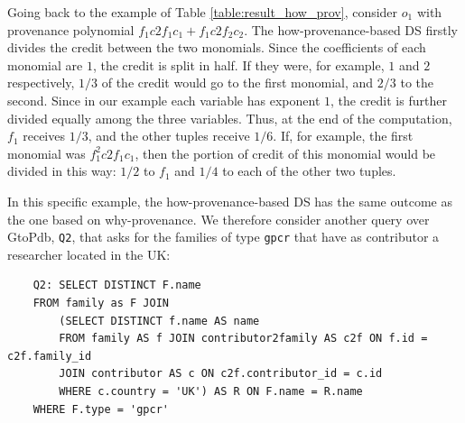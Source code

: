 %


Going back to the example of Table \ref{table:result_how_prov}, consider $o_1$ with provenance polynomial $f_1 c2f_1 c_1 + f_1 c2f_2 c_2$. The how-provenance-based DS firstly divides the credit between the two monomials. Since the coefficients of each monomial are $1$, the credit is split in half. If they were, for example, $1$ and $2$ respectively, $1/3$ of the credit would go to the first monomial, and $2/3$ to the second.  
Since in our example each variable has exponent $1$, the credit is further divided equally among the three variables. Thus, at the end of the computation, $f_1$ receives $1/3$, and the other tuples receive $1/6$.
If, for example, the first monomial was $f_1^2 c2f_1 c_1$, then the portion of credit of this monomial would be divided in this way: $1/2$ to $f_1$ and $1/4$ to each of the other two tuples. 


In this specific example, the how-provenance-based DS has the same outcome as the one based on why-provenance. %
We therefore consider another query over GtoPdb, \texttt{Q2}, that asks for the families of type \texttt{gpcr} that have as contributor a researcher located in the UK:
\begin{verbatim}
	Q2: SELECT DISTINCT F.name 
	FROM family as F JOIN
		(SELECT DISTINCT f.name AS name
		FROM family AS f JOIN contributor2family AS c2f ON f.id = c2f.family_id
		JOIN contributor AS c ON c2f.contributor_id = c.id
		WHERE c.country = 'UK') AS R ON F.name = R.name
	WHERE F.type = 'gpcr'
\end{verbatim}

